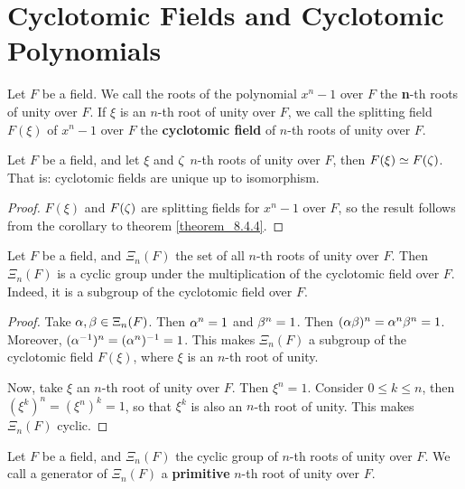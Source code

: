 \section{Cyclotomic Fields and Cyclotomic Polynomials}
\label{section_8.7}

\begin{definition}
  Let $F$ be a field. We call the roots of the polynomial $x^n-1$ over
  $F$ the \textbf{n}-th roots of unity over $F$. If  $\xi$ is an
  $n$-th root of unity over $F$, we call the splitting field $F(\xi)$
  of $x^n-1$ over $F$ the \textbf{cyclotomic field} of $n$-th roots of
  unity over $F$.
\end{definition}

\begin{proposition}\label{proposition_8.7.1}
  Let $F$ be a field, and let $\xi$ and $\zeta$  $n$-th roots of unity
  over $F$, then $F(\xi) \simeq F(\zeta)$. That is: cyclotomic fields are
  unique up to isomorphism.
\end{proposition}
\begin{proof}
  $F(\xi)$ and $F(\zeta)$ are splitting fields for $x^n-1$ over $F$, so
  the result follows from the corollary to theorem
  \ref{theorem_8.4.4}.
\end{proof}

\begin{proposition}\label{proposition_8.7.2}
  Let $F$ be a field, and $\Xi_n(F)$ the set of all $n$-th roots of
  unity over $F$. Then $\Xi_n(F)$ is a cyclic group under the
  multiplication of the cyclotomic field over $F$. Indeed, it is a
  subgroup of the cyclotomic field over $F$.
\end{proposition}
\begin{proof}
  Take $\alpha,\beta \in \Xi_n(F)$. Then $\alpha^n=1$ and $\beta^n=1$. Then
  $(\alpha\beta)^n=\alpha^n\beta^n=1$. Moreover, $(\alpha^{-1})^n=(\alpha^n)^{-1}=1$.
  This makes $\Xi_n(F)$ a subgroup of the cyclotomic field $F(\xi)$,
  where $\xi$ is an $n$-th root of unity.

  Now, take $\xi$ an $n$-th root of unity over $F$. Then $\xi^n=1$.
  Consider $0 \leq k \leq n$, then $(\xi^k)^n=(\xi^n)^k=1$, so
  that $\xi^k$ is also an $n$-th root of unity. This makes $\Xi_n(F)$
  cyclic.
\end{proof}

\begin{definition}
  Let $F$ be a field, and $\Xi_n(F)$ the cyclic group of $n$-th roots
  of unity over $F$. We call a generator of $\Xi_n(F)$ a
  \textbf{primitive} $n$-th root of unity over $F$.
\end{definition}

